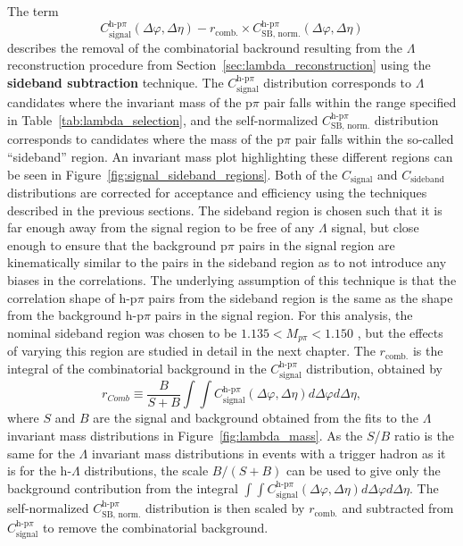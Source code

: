 The term
%
\begin{equation}
C_{\text{signal}}^{\text{h-p}\pi}(\Delta\varphi, \Delta\eta) - r_{\text{comb.}} \times C_{\text{SB, norm.}}^{\text{h-p}\pi}(\Delta\varphi, \Delta\eta)
\end{equation}
%
describes the removal of the combinatorial backround resulting from the $\Lambda$ reconstruction procedure from Section~\ref{sec:lambda_reconstruction} using the \textbf{sideband subtraction} technique. The $C_{\text{signal}}^{\text{h-p}\pi}$ distribution corresponds to $\Lambda$ candidates where the invariant mass of the p$\pi$ pair falls within the range specified in Table~\ref{tab:lambda_selection}, and the self-normalized $C_{\text{SB, norm.}}^{\text{h-p}\pi}$ distribution corresponds to candidates where the mass of the p$\pi$ pair falls within the so-called ``sideband'' region. An invariant mass plot highlighting these different regions can be seen in Figure~\ref{fig:signal_sideband_regions}. Both of the $C_{\text{signal}}$ and $C_{\text{sideband}}$ distributions are corrected for acceptance and efficiency using the techniques described in the previous sections. The sideband region is chosen such that it is far enough away from the signal region to be free of any $\Lambda$ signal, but close enough to ensure that the background p$\pi$ pairs in the signal region are kinematically similar to the pairs in the sideband region as to not introduce any biases in the correlations. The underlying assumption of this technique is that the correlation shape of h-p$\pi$ pairs from the sideband region is the same as the shape from the background h-p$\pi$ pairs in the signal region. For this analysis, the nominal sideband region was chosen to be $1.135 < M_{p\pi} < 1.150$ \GeVmass, but the effects of varying this region are studied in detail in the next chapter. The $r_{\text{comb.}}$ is the integral of the combinatorial background in the $C_{\text{signal}}^{\text{h-p}\pi}$  distribution, obtained by 
%
\begin{equation}
	r_{Comb} \equiv \frac{B}{S+B} \int\int C_{\text{signal}}^{\text{h-p}\pi}(\Delta\varphi, \Delta\eta) d\Delta\varphi d\Delta\eta,
\end{equation}
%
where $S$ and $B$ are the signal and background obtained from the fits to the $\Lambda$ invariant mass distributions in Figure~\ref{fig:lambda_mass}. As the $S$/$B$ ratio is the same for the $\Lambda$ invariant mass distributions in events with a trigger hadron as it is for the h-$\Lambda$ distributions, the scale $B/(S+B)$ can be used to give only the background contribution from the integral $\int\int C_{\text{signal}}^{\text{h-p}\pi}(\Delta\varphi, \Delta\eta) d\Delta\varphi d\Delta\eta$. The self-normalized $C_{\text{SB, norm.}}^{\text{h-p}\pi}$ distribution is then scaled by $r_{\text{comb.}}$ and subtracted from $C_{\text{signal}}^{\text{h-p}\pi}$ to remove the combinatorial background.

